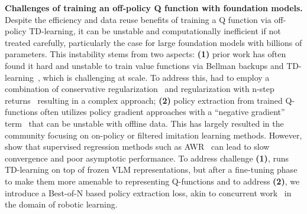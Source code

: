 \textbf{Challenges of training an off-policy Q function with foundation models.} Despite the efficiency and data reuse benefits of training a Q function via off-policy TD-learning, it can be unstable and computationally inefficient if not treated carefully, particularly the case for large foundation models with billions of parameters. This instability stems from two aspects: \textbf{(1)} prior work has often found it hard and unstable to train value functions via Bellman backups and TD-learning~\citep{kumar2021dr3,kumar2022offline,chebotar2023qtransformerscalableofflinereinforcement}, which is challenging at scale. To address this, \citet{chebotar2023qtransformerscalableofflinereinforcement} had to employ a combination of conservative regularization~\citep{kumar2020conservativeqlearningofflinereinforcement} and regularization with n-step returns~\citep{hessel2018rainbow} resulting in a complex approach; \textbf{(2)} policy extraction from trained Q-functions often utilizes policy gradient approaches with a ``negative gradient'' term~\citep{tajwar2024preferencefinetuningllmsleverage} that can be unstable with offline data. This has largely resulted in the community focusing on on-policy or filtered imitation learning methods. However, \citet{park2024valuelearningreallymain} show that supervised regression methods such as AWR~\citep{peng2019advantageweightedregressionsimplescalable} can lead to slow convergence and poor asymptotic performance. To address challenge \textbf{(1)}, \ourmethod{} runs TD-learning on top of frozen VLM representations, but after a fine-tuning phase to make them more amenable to representing Q-functions and to address \textbf{(2)}, we introduce a Best-of-N based policy extraction loss, akin to concurrent work~\citep{sobolmark2024policy} in the domain of robotic learning.

\iffalse

